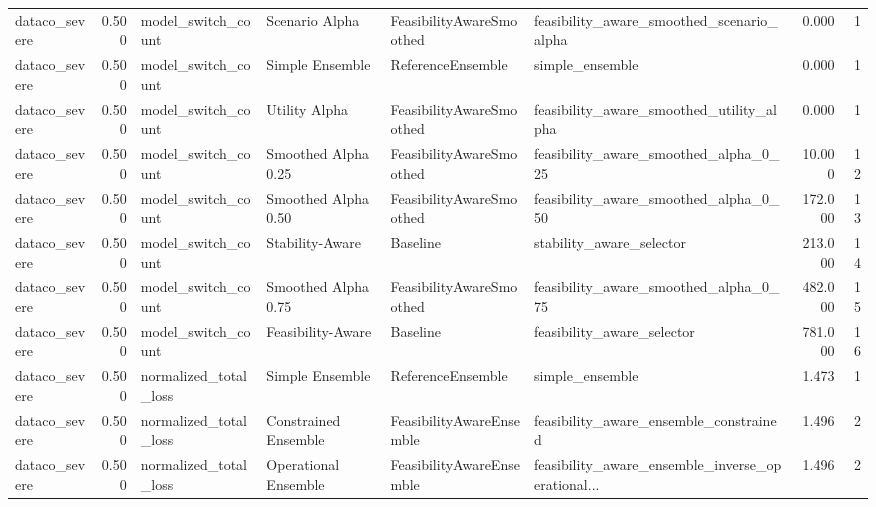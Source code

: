 \begin{table}
{\begin{tabular}{lrllllrr}
 dataco\_severe &             0.500 &          model\_switch\_count &        Scenario Alpha &  FeasibilityAwareSmoothed &          feasibility\_aware\_smoothed\_scenario\_alpha &         0.000 &               1 \\
 dataco\_severe &             0.500 &          model\_switch\_count &       Simple Ensemble &         ReferenceEnsemble &                                    simple\_ensemble &         0.000 &               1 \\
 dataco\_severe &             0.500 &          model\_switch\_count &         Utility Alpha &  FeasibilityAwareSmoothed &           feasibility\_aware\_smoothed\_utility\_alpha &         0.000 &               1 \\
 dataco\_severe &             0.500 &          model\_switch\_count &   Smoothed Alpha 0.25 &  FeasibilityAwareSmoothed &              feasibility\_aware\_smoothed\_alpha\_0\_25 &        10.000 &              12 \\
 dataco\_severe &             0.500 &          model\_switch\_count &   Smoothed Alpha 0.50 &  FeasibilityAwareSmoothed &              feasibility\_aware\_smoothed\_alpha\_0\_50 &       172.000 &              13 \\
 dataco\_severe &             0.500 &          model\_switch\_count &       Stability-Aware &                  Baseline &                           stability\_aware\_selector &       213.000 &              14 \\
 dataco\_severe &             0.500 &          model\_switch\_count &   Smoothed Alpha 0.75 &  FeasibilityAwareSmoothed &              feasibility\_aware\_smoothed\_alpha\_0\_75 &       482.000 &              15 \\
 dataco\_severe &             0.500 &          model\_switch\_count &     Feasibility-Aware &                  Baseline &                         feasibility\_aware\_selector &       781.000 &              16 \\
 dataco\_severe &             0.500 &       normalized\_total\_loss &       Simple Ensemble &         ReferenceEnsemble &                                    simple\_ensemble &         1.473 &               1 \\
 dataco\_severe &             0.500 &       normalized\_total\_loss &  Constrained Ensemble &  FeasibilityAwareEnsemble &             feasibility\_aware\_ensemble\_constrained &         1.496 &               2 \\
 dataco\_severe &             0.500 &       normalized\_total\_loss &  Operational Ensemble &  FeasibilityAwareEnsemble &  feasibility\_aware\_ensemble\_inverse\_operational... &         1.496 &               2 \\

\end{tabular}}
\end{table}
